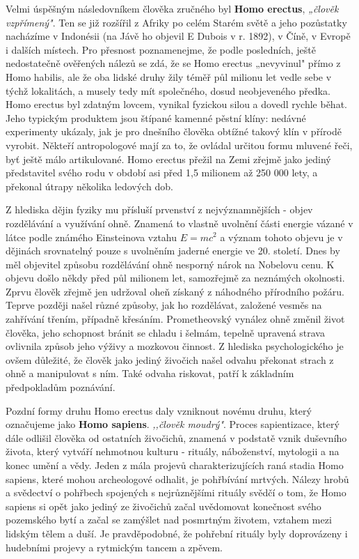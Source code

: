         Velmi úspěšným následovníkem člověka zručného byl \textbf{Homo erectus}, \emph{„člověk
        vzpřímený"}. Ten se již rozšířil z Afriky po celém Starém světě a jeho pozůstatky nacházíme
        v Indonésii (na Jávě ho objevil E Dubois v r. 1892), v Číně, v Evropě i dalších místech. Pro
        přesnost poznamenejme, že podle posledních, ještě nedostatečně ověřených nálezů se zdá, že
        se Homo erectus „nevyvinul" přímo z Homo habilis, ale že oba lidské druhy žily téměř půl
        milionu let vedle sebe v týchž lokalitách, a musely tedy mít společného, dosud neobjeveného
        předka. Homo erectus byl zdatným lovcem, vynikal fyzickou silou a dovedl rychle běhat. Jeho
        typickým produktem jsou štípané kamenné pěstní klíny: nedávné experimenty ukázaly, jak je
        pro dnešního člověka obtížné takový klín v přírodě vyrobit. Někteří antropologové mají za
        to, že ovládal určitou formu mluvené řeči, byť ještě málo artikulované. Homo erectus přežil
        na Zemi zřejmě jako jediný představitel svého rodu v období asi před 1,5 milionem až 250 000
        lety, a překonal útrapy několika ledových dob.

        Z hlediska dějin fyziky mu přísluší prvenství z nejvýznamnějších - objev rozdělávání a
        využívání ohně. Znamená to vlastně uvolnění části energie vázané v látce podle známého
        Einsteinova vztahu \(E = mc^2\) a význam tohoto objevu je v dějinách srovnatelný pouze s
        uvolněním jaderné energie ve 20. století. Dnes by měl objevitel způsobu rozdělávání ohně
        nesporný nárok na Nobelovu cenu. K objevu došlo někdy před půl milionem let, samozřejmě za
        neznámých okolnosti. Zprvu člověk zřejmě jen udržoval oheň získaný z náhodného přírodního
        požáru. Teprve později našel různé způsoby, jak ho rozdělávat, založené vesměs na zahřívání
        třením, případně křesáním. Prometheovský vynález ohně změnil život člověka, jeho schopnost
        bránit se chladu i šelmám, tepelně upravená strava ovlivnila způsob jeho výživy a mozkovou
        činnost. Z hlediska psychologického je ovšem důležité, že člověk jako jediný živočich našel
        odvahu překonat strach z ohně a manipulovat s ním. Také odvaha riskovat, patří k základním
        předpokladům poznávání.

        Pozdní formy druhu Homo erectus daly vzniknout novému druhu, který označujeme jako
        \textbf{Homo sapiens}. \emph{,,člověk moudrý"}. Proces sapientizace, který dále odlišil
        člověka od ostatních živočichů, znamená v podstatě vznik duševního života, který vytváří
        nehmotnou kulturu - rituály, náboženství, mytologii a na konec umění a vědy. Jeden z mála
        projevů charakterizujících raná stadia Homo sapiens, které mohou archeologové odhalit, je
        pohřbívání mrtvých. Nálezy hrobů a svědectví o pohřbech spojených s nejrůznějšími rituály
        svědčí o tom, že Homo sapiens si opět jako jediný ze živočichů začal uvědomovat konečnost
        svého pozemského bytí a začal se zamýšlet nad posmrtným životem, vztahem mezi lidským tělem
        a duší. Je pravděpodobné, že pohřební rituály byly doprovázeny i hudebními projevy a
        rytmickým tancem a zpěvem.

